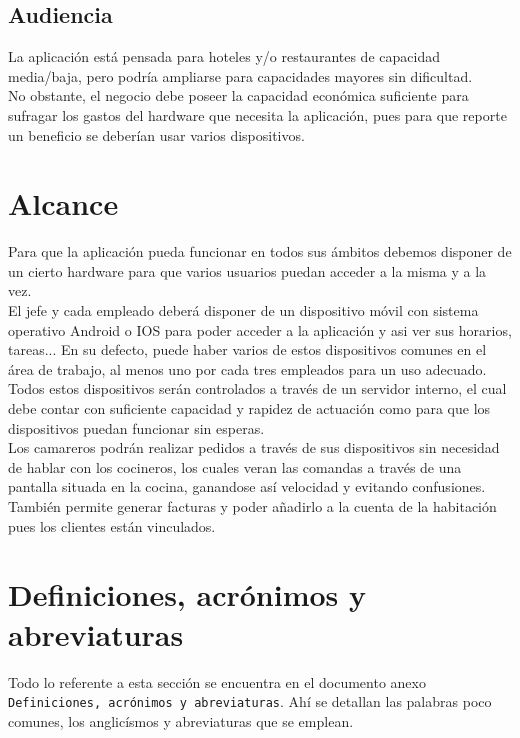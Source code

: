 \documentclass[spanish,a4paper,11pt, twoside]{report}	%
\begin{document}
		\subsection{Audiencia} La aplicación está pensada para hoteles y/o restaurantes de capacidad media/baja, pero podría ampliarse para capacidades mayores sin dificultad. \\

No obstante, el negocio debe poseer la capacidad económica suficiente para sufragar los gastos del hardware que necesita la aplicación, pues para que reporte un beneficio se deberían usar varios dispositivos.

\section{Alcance}

Para que la aplicación pueda funcionar en todos sus ámbitos debemos disponer de un cierto hardware para que varios usuarios puedan acceder a la misma y a la vez.\\

 El jefe y cada empleado deberá disponer de un dispositivo móvil con sistema operativo Android o IOS para poder acceder a la aplicación y asi ver sus horarios, tareas... En su defecto, puede haber varios de estos dispositivos comunes en el área de trabajo, al menos uno por cada tres empleados para un uso adecuado. \\

Todos estos dispositivos serán controlados a través de un servidor interno, el cual debe contar con suficiente capacidad y rapidez de actuación como para que los dispositivos puedan funcionar sin esperas.\\

Los camareros podrán realizar pedidos a través de sus dispositivos sin necesidad de hablar con los cocineros, los cuales veran las comandas a través de una pantalla situada en la cocina, ganandose así velocidad y evitando confusiones. También permite generar facturas y poder añadirlo a la cuenta de la habitación pues los clientes están vinculados.


\section{Definiciones, acrónimos y abreviaturas}

Todo lo referente a esta sección se encuentra en el documento anexo \texttt{Definiciones, acrónimos y abreviaturas}. Ahí se detallan las palabras poco comunes, los anglicísmos y abreviaturas que se emplean.
\end{document}
